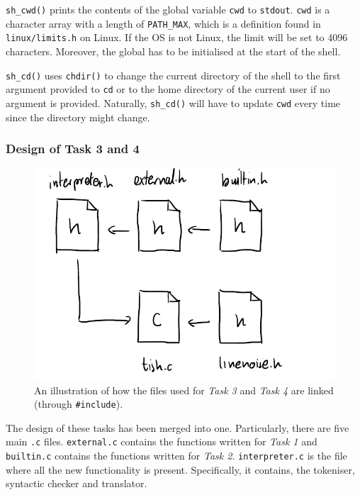 \documentclass[12pt]{article}
\begin{document}


\newpage



\texttt{sh\_cwd()} prints the contents of the global variable
\texttt{cwd} to \texttt{stdout}. \texttt{cwd} is a character
array with a length of \texttt{PATH\_MAX}, which is a definition
found in \texttt{linux/limits.h} on Linux. If the OS is not
Linux, the limit will be set to 4096 characters. Moreover, the
global has to be initialised at the start of the shell.

\texttt{sh\_cd()} uses \texttt{chdir()} to change the current
directory of the shell to the first argument provided to
\texttt{cd} or to the home directory of the current user if no
argument is provided. Naturally, \texttt{sh\_cd()} will have to
update \texttt{cwd} every time since the directory might change.

\subsubsection{Design of Task 3 and 4}

\begin{figure}[H]
\centering
\includegraphics{task3arch}
\caption{An illustration of how the files used for \textit{Task
3} and \textit{Task 4} are linked (through \texttt{\#include}).}
\end{figure}

The design of these tasks has been merged into one.
Particularly, there are five main \texttt{.c} files.
\texttt{external.c} contains the functions written for
\textit{Task 1} and \texttt{builtin.c} contains the functions
written for \textit{Task 2}. \texttt{interpreter.c} is the file
where all the new functionality is present. Specifically, it
contains, the tokeniser, syntactic checker and translator.
\end{document}
